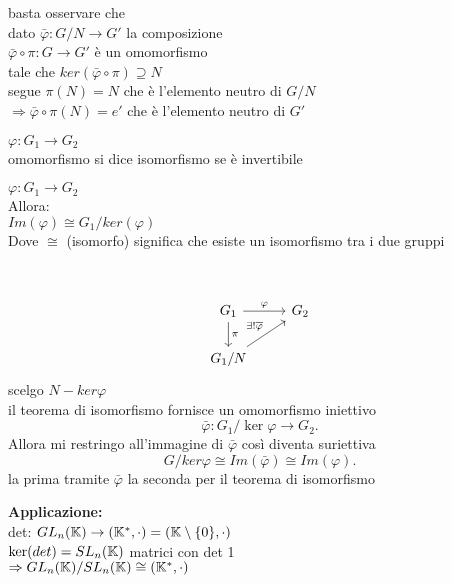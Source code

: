 \documentclass[12px]{article}
\begin{document}
	  \begin{dimo}
		  basta osservare che\\
		  dato $\bar \varphi: G/N \rightarrow G'$ la composizione\\
		  $\bar \varphi\circ \pi: G \rightarrow G'$ è un omomorfismo\\
		  tale che $ker(\bar \varphi\circ \pi)\supseteq N$\\
		  segue $\pi(N) = N$ che è l'elemento neutro di  $G/N$\\
		   $ \Rightarrow \bar \varphi\circ \pi (N) = e'$ che è l'elemento neutro  di $G'$\\
		   \end{dimo}
		    \begin{defi}
		   	$ \varphi: G_1 \rightarrow G_2$\\
			omomorfismo si dice isomorfismo se è invertibile\\

		   \end{defi}
		   \begin{teo}
		   	$ \varphi:G_1 \rightarrow G_2$\\
			Allora:\\
			$Im( \varphi) \cong G_1/ker( \varphi)$\\
			Dove $\cong$ (isomorfo) significa che esiste un isomorfismo tra i due gruppi
		   \end{teo}\\
		   \begin{dimo}
		   \[
\begin{tikzcd}
G_1 \arrow[r, "\varphi"] \arrow[d, "\pi"] & G_2 \\
G_1 / N \arrow[ur, "\exists ! \overline{\varphi}"]
\end{tikzcd}
\]	
scelgo $N-ker \varphi$\\
il teorema di isomorfismo fornisce un omomorfismo iniettivo
\[
\bar\varphi: G_1/\ker \varphi \rightarrow G_2
.\] 
Allora mi restringo all'immagine di $\bar \varphi$ così diventa suriettiva\\
\[
G/ker \varphi \cong  Im ( \bar\varphi) \cong Im( \varphi)
.\] 
la prima tramite $\bar \varphi$ la seconda per il teorema di isomorfismo\\
\end{dimo}
\textbf{Applicazione:}\\
det: $GL_n(\mathbb{K}) \rightarrow (\mathbb{K}^*,\cdot) = (\mathbb{K}\setminus\{0\},\cdot)$ \\
$\ker(det) = SL_n(\mathbb{K})$ matrici con det 1\\
$ \Rightarrow GL_n(\mathbb{K})/SL_n(\mathbb{K}) \cong (\mathbb{K}^*,\cdot)$
		   \newpage
\end{document}
